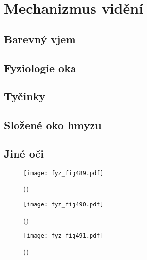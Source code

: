 {
\chapter{Mechanizmus vidění}\label{fyz:IchapXXXVI}
\minitoc
  \section{Barevný vjem}\label{fyz:IchapXXXVIsecI}
  \section{Fyziologie oka}\label{fyz:IchapXXXVIsecII}
  \section{Tyčinky}\label{fyz:IchapXXXVIsecIII}
  \section{Složené oko hmyzu}\label{fyz:IchapXXXVIsecIV}
  \section{Jiné oči}\label{fyz:IchapXXXVIsecV}

  \begin{figure}[ht!] %
    \centering
    \texttt{[image: fyz\_fig489.pdf]}
    \caption{
             (\cite[s.~697]{Feynman01})}
    \label{fyz:fig489}
  \end{figure}

  \begin{figure}[ht!] %
    \centering
    \texttt{[image: fyz\_fig490.pdf]}
    \caption{
             (\cite[s.~697]{Feynman01})}
    \label{fyz:fig490}
  \end{figure}

  \begin{figure}[ht!] %
    \centering
    \texttt{[image: fyz\_fig491.pdf]}
    \caption{
             (\cite[s.~697]{Feynman01})}
    \label{fyz:fig491}
  \end{figure}

}
